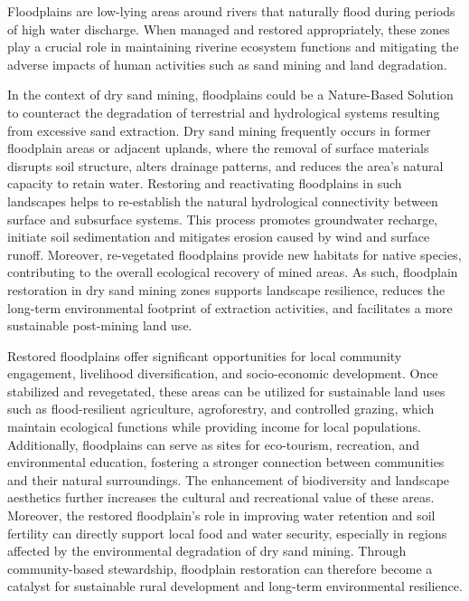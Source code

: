 Floodplains are low-lying areas around rivers that naturally flood during periods of high water discharge. When managed and restored appropriately, these zones play a crucial role in maintaining riverine ecosystem functions and mitigating the adverse impacts of human activities such as sand mining and land degradation.

In the context of dry sand mining, floodplains could be a Nature-Based Solution to counteract the degradation of terrestrial and hydrological systems resulting from excessive sand extraction. Dry sand mining frequently occurs in former floodplain areas or adjacent uplands, where the removal of surface materials disrupts soil structure, alters drainage patterns, and reduces the area’s natural capacity to retain water. Restoring and reactivating floodplains in such landscapes helps to re-establish the natural hydrological connectivity between surface and subsurface systems. This process promotes groundwater recharge, initiate soil sedimentation and mitigates erosion caused by wind and surface runoff. Moreover, re-vegetated floodplains provide new habitats for native species, contributing to the overall ecological recovery of mined areas. As such, floodplain restoration in dry sand mining zones supports landscape resilience, reduces the long-term environmental footprint of extraction activities, and facilitates a more sustainable post-mining land use.

Restored floodplains offer significant opportunities for local community engagement, livelihood diversification, and socio-economic development. Once stabilized and revegetated, these areas can be utilized for sustainable land uses such as flood-resilient agriculture, agroforestry, and controlled grazing, which maintain ecological functions while providing income for local populations. Additionally, floodplains can serve as sites for eco-tourism, recreation, and environmental education, fostering a stronger connection between communities and their natural surroundings. The enhancement of biodiversity and landscape aesthetics further increases the cultural and recreational value of these areas. Moreover, the restored floodplain’s role in improving water retention and soil fertility can directly support local food and water security, especially in regions affected by the environmental degradation of dry sand mining. Through community-based stewardship, floodplain restoration can therefore become a catalyst for sustainable rural development and long-term environmental resilience.

